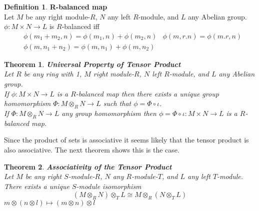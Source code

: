 \documentclass{article}
\theoremstyle{plain}
\newtheorem{thm}{Theorem}[section]
\theoremstyle{definition}
\newtheorem{defn}{Definition}[section]
\theoremstyle{remark}
\begin{document}
  \begin{defn}\textbf{R-balanced map}\\
    Let $M$ be any right module-$R$, $N$ any left $R$-module, and $L$ any 
    Abelian group.\\[1em]
    $\phi:M\times N\to L$ is $R$-balanced iff
    \begin{align*}
      &\phi(m_1+m_2,n)=\phi(m_1,n)+\phi(m_2,n)
      &\phi(m,r.n)=\phi(m.r,n) \\
      &\phi(m,n_1+n_2)=\phi(m,n_1)+\phi(m,n_2)
    \end{align*}
  \end{defn}
  \begin{thm}\textbf{Universal Property of Tensor Product}\\
    Let $R$ be any ring with 1, $M$ right module-$R$, $N$ left
    $R$-module, and $L$ any Abelian group. \\[1em]
    If $\phi:M\times N\to L$ is a $R$-balanced map then there exists a 
    unique group homomorphism $\Phi:M\otimes_RN\to L$ such that $\phi=\Phi\circ\iota$.\\[1em]
    If $\Phi:M\otimes_RN\to L$ any group homomorphism then 
    $\phi=\Phi\circ\iota:M\times N\to L$ is a $R$-balanced map.
  \end{thm}
  Since the product of sets is associative it seems likely that the tensor
  product is also associative. The next theorem shows this is the case.
  \begin{thm}\textbf{Associativity of the Tensor Product}\\
    Let $M$ be any right $S$-module-$R$, $N$ any $R$-module-$T$, and $L$
    any left $T$-module.
    \\[1em]
    There exists a unique $S$-module isomorphism
   \[ (M\otimes_RN)\otimes_TL\cong M\otimes_R(N\otimes_T L) \]
   $m\otimes(n\otimes l)\mapsto (m\otimes n)\otimes l$
  \end{thm}
\end{document}
